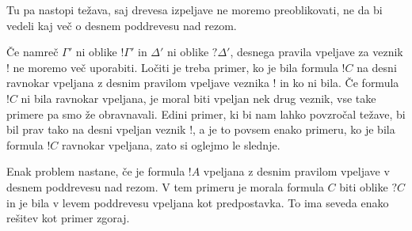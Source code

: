 Tu pa nastopi težava, saj drevesa izpeljave ne moremo preoblikovati, ne da bi vedeli kaj več o desnem poddrevesu nad rezom.
\begin{prooftree}
\end{prooftree}
Če namreč $\Gamma'$ ni oblike $!\Gamma'$ in $\Delta'$ ni oblike $?\Delta'$, desnega pravila vpeljave za veznik ! ne moremo več uporabiti. Ločiti je treba primer, ko je bila formula $!C$ na desni ravnokar vpeljana z desnim pravilom vpeljave veznika ! in ko ni bila. Če formula $!C$ ni bila ravnokar vpeljana, je moral biti vpeljan nek drug veznik, vse take primere pa smo že obravnavali. Edini primer, ki bi nam lahko povzročal težave, bi bil prav tako na desni vpeljan veznik !, a je to povsem enako primeru, ko je bila formula $!C$ ravnokar vpeljana, zato si oglejmo le slednje.
\begin{prooftree}

\end{prooftree}
\dol
\begin{prooftree}

\end{prooftree}
Enak problem nastane, če je formula $!A$ vpeljana z desnim pravilom vpeljave v desnem poddrevesu nad rezom. V tem primeru je morala formula $C$ biti oblike $?C$ in je bila v levem poddrevesu vpeljana kot predpostavka. To ima seveda enako rešitev kot primer zgoraj.
